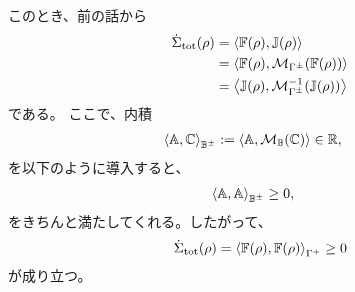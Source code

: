 \documentclass[a4paper,11pt]{jsarticle}
\numberwithin{equation}{section}
\begin{document}
このとき、前の話から
\begin{align}
\dot{\Sigma}_{\mathrm{tot}}(\rho)
&= \ev{\mathbb{F}(\rho), \mathbb{J}(\rho)}\\
&= \ev{\mathbb{F}(\rho), \mathcal{M}_{\Gamma^{\pm}}(\mathbb{F}(\rho))}\\
&= \ev{\mathbb{J}(\rho), \mathcal{M}_{\Gamma^{\pm}}^{-1}(\mathbb{J}(\rho))}
\end{align}
である。
ここで、内積
\begin{align}
\ev{\mathbb{A}, \mathbb{C}}_{\mathbb{B}^{\pm}}
&:= \ev{\mathbb{A}, \mathcal{M}_{\mathbb{B}}(\mathbb{C})} \in \mathbb{R},
\end{align}
を以下のように導入すると、
\begin{align}
\ev{\mathbb{A}, \mathbb{A}}_{\mathbb{B}^{\pm}} &\ge 0,
\end{align}
をきちんと満たしてくれる。したがって、
\begin{align}
\dot{\Sigma}_{\mathrm{tot}}(\rho)
= \ev{\mathbb{F}(\rho), \mathbb{F}(\rho)}_{\Gamma^{+}}
\ge 0
\end{align}
が成り立つ。
\end{document}
